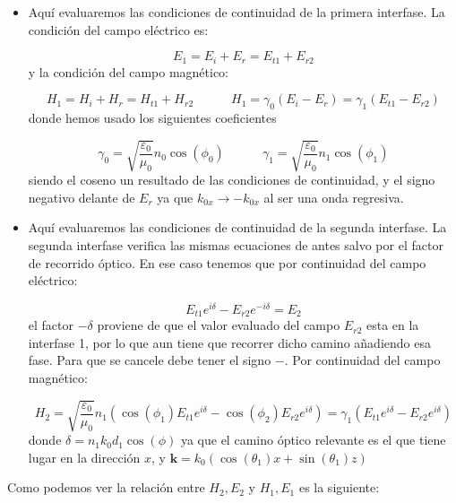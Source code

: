 \documentclass[12pt,a4paper]{book}
\numberwithin{equation}{section}
\numberwithin{figure}{section}
\newcommand{\tquad}{\quad \quad \quad}
\newcommand{\parentesis}[1]{\left( #1  \right)}
\newcommand{\1}{_{(1)}}
\newcommand{\2}{_{(2)}}
\newcommand{\kn}{\mathbf{k}}
\theoremstyle{definition}
\begin{document}
\begin{itemize}
\item Aquí evaluaremos las condiciones de continuidad de la primera interfase. La condición del campo eléctrico es:

\begin{equation}
E_1=E_i+E_r=E_{t1}+E_{r2}
\end{equation}
y la condición del campo magnético:

\begin{equation}
H_1 = H_i + H_r = H_{t1} + H_{r2} \tquad  H_1= \gamma_0 (E_i-E_r)   = \gamma_1 (E_{t1} - E_{r2})
\end{equation}
donde hemos usado los siguientes coeficientes

\begin{equation}
\gamma_0 = \sqrt{\frac{\varepsilon_0}{\mu_0}} n_0 \cos(\phi_0) \tquad 
\gamma_1 = \sqrt{\frac{\varepsilon_0}{\mu_0}} n_1 \cos(\phi_1)
\end{equation}
siendo el coseno un resultado de las condiciones de continuidad, y el signo negativo delante de $E_r$ ya que $k_{0x}\rightarrow -k_{0x}$ al ser una onda regresiva.

\item Aquí evaluaremos las condiciones de continuidad de la segunda interfase. La segunda interfase verifica las mismas ecuaciones de antes salvo por el factor de recorrido óptico. En ese caso tenemos que por continuidad del campo eléctrico:

\begin{equation}
E_{t1}e^{i \delta} -E_{r2}e^{-i \delta} = E_2
\end{equation}
el factor $-\delta$ proviene de que el valor evaluado del campo $E_{r2}$ esta en la interfase 1, por lo que aun tiene que recorrer dicho camino añadiendo esa fase. Para que se cancele debe tener el signo $-$. Por continuidad del campo magnético:

\begin{equation}
H_2=\sqrt{\frac{\varepsilon_0}{\mu_0}} n_1 \parentesis{
\cos (\phi_1) E_{t1}e^{i \delta} - \cos (\phi_2) E_{r2}e^{i \delta}} = \gamma_1 \parentesis{E_{t1}e^{i \delta} -E_{r2}e^{i \delta}}
\end{equation}
donde $\delta = n_1k_0d_1 \cos (\phi)$ ya que el camino óptico relevante es el que tiene lugar en la dirección $x$, y $\kn=k_0(\cos(\theta_1)x+\sin(\theta_1)z)$
\end{itemize} 
Como podemos ver la relación entre $H_2,E_2$ y $H_1,E_1$ es la siguiente:
\end{document}
